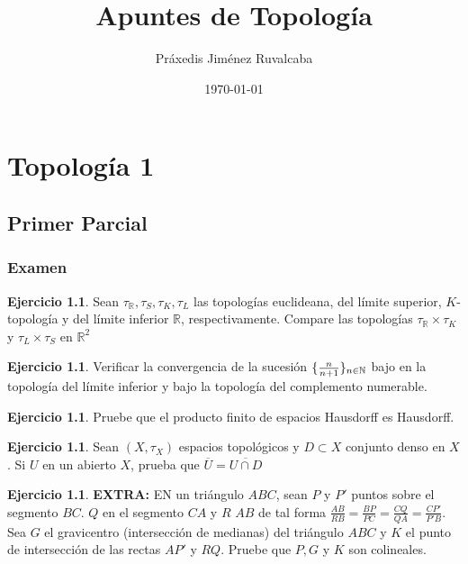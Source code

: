 \documentclass[11pt,a4paper,oneside]{report}
\title{Apuntes de Topología}
\author{Práxedis Jiménez Ruvalcaba}
\date{\today}
\theoremstyle{definition}
\newtheorem{ejercicio}[definicion]{Ejercicio}
\theoremstyle{plain}
\theoremstyle{remark}
\newcommand{\N}{\mathbb{N}}
\newcommand{\R}{\mathbb{R}}
\DeclarePairedDelimiter{\conj}{\{}{\}}
\begin{document}
\maketitle
\tableofcontents

\part{Topología 1}

\chapter{Primer Parcial}

\section{Examen}

\begin{ejercicio}
  Sean $\tau_\R, \tau_S, \tau_K, \tau_L$ las topologías euclideana, del límite superior,
  $K$-topología y del límite inferior $\R$, respectivamente. Compare las topologías 
  $\tau_\R \times \tau_K$ y $\tau_L \times \tau_S$ en $\R^2$
\end{ejercicio}

\begin{ejercicio}
  Verificar la convergencia de la sucesión $\conj{\frac{n}{n+1}}_{n\in \N}$ bajo en la topología
  del límite inferior y bajo la topología del complemento numerable.
\end{ejercicio}

\begin{ejercicio}
  Pruebe que el producto finito de espacios Hausdorff es Hausdorff.
\end{ejercicio}

\begin{ejercicio}
  Sean $(X,\tau_X)$ espacios topológicos y $D \subset X$ conjunto denso en $X$. 
  Si $U$ en un abierto $X$, prueba que $\overline{U}=\overline{U\cap D}$
\end{ejercicio}

\begin{ejercicio}
  \textbf{EXTRA: }EN un triángulo $ABC$, sean $P$ y $P'$ puntos sobre el segmento
  $BC$. $Q$ en el segmento $CA$ y $R$ $AB$ de tal forma $\frac{AB}{RB}=\frac{BP}{PC}=\frac{CQ}{QA}=\frac{CP'}{P'B}$.
  Sea $G$ el gravicentro (intersección de medianas) del triángulo $ABC$ y $K$ el punto de intersección de las rectas 
  $AP'$ y $RQ$. Pruebe que $P, G$ y $K$ son colineales.
\end{ejercicio}
\end{document}
